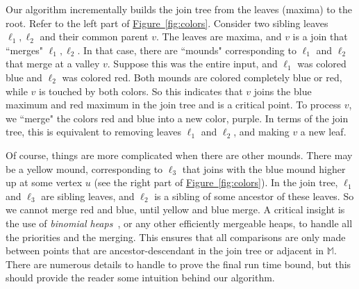 \documentclass[11pt]{article}
\theoremstyle{definition}
\newcommand{\MM}{\mathbb{M}}
\newcommand{\Fig}[1]{\hyperref[fig:#1]{Figure~\ref*{fig:#1}}} %
\begin{document}
{Our algorithm incrementally builds the join tree from the leaves (maxima) to the root. 
Refer to the left part of \Fig{colors}.
Consider two sibling leaves $\ell_1, \ell_2$ and their common parent $v$. The leaves are maxima,
and $v$ is a join that ``merges" $\ell_1, \ell_2$. 
In that case, there are ``mounds" corresponding to $\ell_1$ and $\ell_2$ that merge
at a valley $v$. Suppose this was the entire input, and $\ell_1$ was colored blue and $\ell_2$ was colored red. 
Both mounds are colored completely blue or red, while $v$ is touched by both colors.
So this indicates that $v$ joins the blue maximum and red maximum in the join tree and is a critical point.
To process $v$, we ``merge" the colors red and blue into a new color, purple. 
In terms of the join tree, this
is equivalent to removing leaves $\ell_1$ and $\ell_2$, and making $v$ a new leaf.

Of course, things are more complicated when there are other mounds. There may be a yellow mound,
corresponding to $\ell_3$ that joins with the blue mound higher up at some vertex $u$ (see the right part of \Fig{colors}). In the join tree, $\ell_1$ and $\ell_3$
are sibling leaves, and $\ell_2$ is a sibling of some ancestor of these leaves. So we cannot
merge red and blue, until yellow and blue merge. 
A critical insight is the use of \emph{binomial heaps}~\cite{Vu78}, or any other efficiently mergeable heaps, to handle all the priorities and the merging.
This ensures that all comparisons are only made between points that are ancestor-descendant in the join tree or adjacent in $\MM$.
There are numerous details to handle to prove the final run time bound, but this should provide the reader
some intuition behind our algorithm.

}
\end{document}
